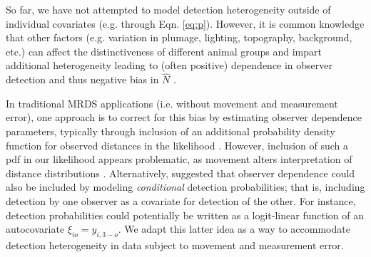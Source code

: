 \documentclass[12pt,fleqn]{article}
\begin{document}
So far, we have not attempted to model detection heterogeneity outside of individual covariates (e.g. through Eqn. \ref{eq:p}).  However, it is common knowledge that other factors (e.g. variation in plumage, lighting, topography, background, etc.) can affect the distinctiveness of different animal groups and impart additional heterogeneity leading to (often positive) dependence in observer detection and thus negative bias in $\hat{N}$ \citep{LaakeBorchers2004,BucklandEtAl2010,BurtEtAl2014}.

In traditional MRDS applications (i.e. without movement and measurement error), one approach is to correct for this bias by estimating observer dependence parameters, typically through inclusion of an additional probability density function for observed distances in the likelihood \citep[cf.][]{BucklandEtAl2010}.  However, inclusion of such a pdf in our likelihood appears problematic, as movement alters interpretation of distance distributions \citep{BurtEtAl2014}.  Alternatively, \citet{MacKenzieClement2016} suggested that observer dependence could also be included by modeling \textit{conditional} detection probabilities; that is, including detection by one observer as a covariate for detection of the other.  For instance, detection probabilities could potentially be written as a logit-linear function of an autocovariate $\xi_{io} = y_{i,3-o}$.  We adapt this latter idea as a way to accommodate detection heterogeneity in data subject to movement and measurement error.
\end{document}

